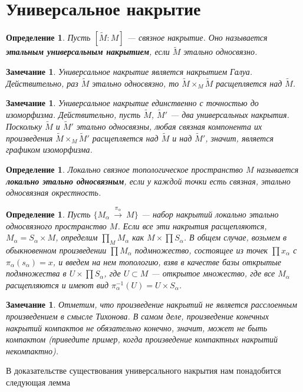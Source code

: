 \documentclass[12pt]{book}
\newcommand{\arrow}{{\:\longrightarrow\:}}
\theoremstyle{upshape}
\newtheorem{zadacha}{Задача}[chapter]
\theoremstyle{generic}
\newtheorem{opredelenie}[teorema]{Определение}
\newtheorem{remark}[teorema]{Замечание}
\def\замечание{\begin{remark}}
\def\еза{\end{remark}}
\theoremstyle{upshapenonumber}
\newcommand{\следствие}{%
     \refstepcounter{teorema}
     {\noindent\bf Следствие \thechapter.\arabic{teorema}:\ }}
\newcommand{\пример}{%
     \refstepcounter{teorema}
     {\noindent\bf Пример \thechapter.\arabic{teorema}:\ }}
\newcommand{\лемма}{%
     \refstepcounter{teorema}
     {\noindent\bf Лемма \thechapter.\arabic{teorema}:\ }}
\newcommand{\теорема}{%
     \refstepcounter{teorema}
     {\noindent\bf Теорема \thechapter.\arabic{teorema}:\ }}
\newcommand{\утверждение}{%
     \refstepcounter{teorema}
     {\noindent\bf Утверждение \thechapter.\arabic{teorema}:\ }}
\def\хфилл{\hfill}
\def\бф{\bf}
\def\ем{\em}
\def\задача{\begin{zadacha}}
\def\ез{\end{zadacha}}
\def\еу{\end{ukazanie}}
\def\определение{\begin{opredelenie}}
\def\ео{\end{opredelenie}}
\def\енум{\begin{enumerate}}
\def\ее{\end{enumerate}}
\begin{document}

\section{Универсальное накрытие}



\определение
Пусть $[\tilde M:M]$ --- связное накрытие.
Оно называется {\бф этальным универсальным накрытием},
если $\tilde M$ этально односвязно.
\ео

\замечание
Универсальное накрытие является накрытием Галуа.
Действительно, раз $\tilde M$ этально односвязно, то 
$\tilde M \times_M \tilde M$ расщепляется над $\tilde M$.
\еза

\замечание
Универсальное накрытие 
единственно с точностью до изоморфизма. Действительно,
пусть $\tilde M$, $\tilde M'$ --- два
универсальных накрытия. Поскольку $\tilde M$
и $\tilde M'$ этально односвязны, любая связная компонента их
произведения $\tilde M \times_M \tilde M'$ расщепляется
над $\tilde M$ и над $\tilde M'$, значит, является
графиком изоморфизма.
\еза

\определение
Локально связное топологическое пространство $M$ называется
{\бф локально этально односвязным}, если у каждой точки
есть связная, этально односвязная окрестность.
\ео


\определение
Пусть $\{M_\alpha\stackrel{\pi_\alpha}\arrow M\}$ --- набор накрытий 
локально этально односвязного пространство $M$. Если
все эти накрытия расщепляются, 
$M_\alpha = S_\alpha \times M$, определим
$\prod_M M_\alpha$ как $M \times \prod S_\alpha$.
В общем случае, возьмем в обыкновенном произведении 
$\prod M_\alpha$ подмножество, состоящее
из точек $\prod x_\alpha$ с $\pi_\alpha(s_\alpha) =x$,
и введем на нем топологию, взяв в качестве
базы открытые подмножества в $U \times \prod S_\alpha$,
где $U\subset M$ --- открытое множество, где все
$M_\alpha$ расщепляются и имеют вид 
$\pi_\alpha^{-1} (U) = U \times S_\alpha$.
\ео

\замечание
Отметим, что произведение накрытий
не является расслоенным произведением
в смысле Тихонова. В самом деле,
произведение конечных накрытий
компактов не обязательно конечно, значит,
может не быть компактом (приведите пример,
когда произведение компактных накрытий некомпактно).
\еза

В доказательстве существования универсального
накрытия нам понадобится следующая лемма

\хфилл
\end{document}

